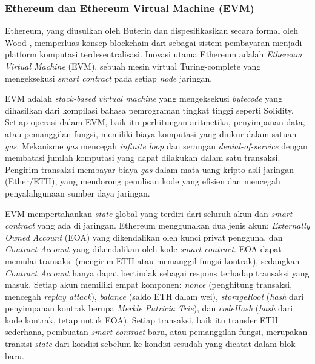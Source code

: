 \subsubsection{Ethereum dan Ethereum Virtual Machine (EVM)}

Ethereum, yang diusulkan oleh Buterin \cite{buterin2014ethereum} dan dispesifikasikan secara formal oleh Wood \cite{wood2014ethereum}, memperluas konsep blockchain dari sebagai sistem pembayaran menjadi platform komputasi terdesentralisasi. Inovasi utama Ethereum adalah \textit{Ethereum Virtual Machine} (EVM), sebuah mesin virtual Turing-complete yang mengeksekusi \textit{smart contract} pada setiap \textit{node} jaringan.

EVM adalah \textit{stack-based virtual machine} yang mengeksekusi \textit{bytecode} yang dihasilkan dari kompilasi bahasa pemrograman tingkat tinggi seperti Solidity. Setiap operasi dalam EVM, baik itu perhitungan aritmetika, penyimpanan data, atau pemanggilan fungsi, memiliki biaya komputasi yang diukur dalam satuan \textit{gas}. Mekanisme \textit{gas} mencegah \textit{infinite loop} dan serangan \textit{denial-of-service} dengan membatasi jumlah komputasi yang dapat dilakukan dalam satu transaksi. Pengirim transaksi membayar biaya \textit{gas} dalam mata uang kripto asli jaringan (Ether/ETH), yang mendorong penulisan kode yang efisien dan mencegah penyalahgunaan sumber daya jaringan.

EVM mempertahankan \textit{state} global yang terdiri dari seluruh akun dan \textit{smart contract} yang ada di jaringan. Ethereum menggunakan dua jenis akun: \textit{Externally Owned Account} (EOA) yang dikendalikan oleh kunci privat pengguna, dan \textit{Contract Account} yang dikendalikan oleh kode \textit{smart contract}. EOA dapat memulai transaksi (mengirim ETH atau memanggil fungsi kontrak), sedangkan \textit{Contract Account} hanya dapat bertindak sebagai respons terhadap transaksi yang masuk. Setiap akun memiliki empat komponen: \textit{nonce} (penghitung transaksi, mencegah \textit{replay attack}), \textit{balance} (saldo ETH dalam wei), \textit{storageRoot} (\textit{hash} dari penyimpanan kontrak berupa \textit{Merkle Patricia Trie}), dan \textit{codeHash} (\textit{hash} dari kode kontrak, tetap untuk EOA). Setiap transaksi, baik itu transfer ETH sederhana, pembuatan \textit{smart contract} baru, atau pemanggilan fungsi, merupakan transisi \textit{state} dari kondisi sebelum ke kondisi sesudah yang dicatat dalam blok baru.

